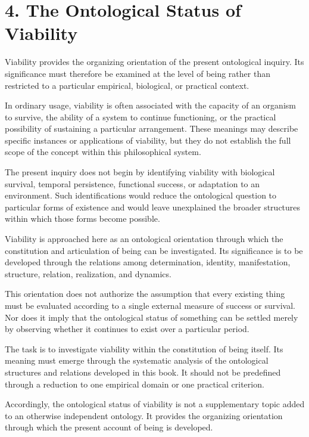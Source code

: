 
\section*{4. The Ontological Status of Viability}

Viability provides the organizing orientation of the
present ontological inquiry. Its significance must therefore
be examined at the level of being rather than restricted
to a particular empirical, biological, or practical context.

In ordinary usage, viability is often associated with the
capacity of an organism to survive, the ability of a system
to continue functioning, or the practical possibility
of sustaining a particular arrangement. These meanings
may describe specific instances or applications of
viability, but they do not establish the full scope of
the concept within this philosophical system.

The present inquiry does not begin by identifying
viability with biological survival, temporal persistence,
functional success, or adaptation to an environment.
Such identifications would reduce the ontological question
to particular forms of existence and would leave unexplained
the broader structures within which those forms become
possible.

Viability is approached here as an ontological orientation
through which the constitution and articulation of being
can be investigated. Its significance is to be developed
through the relations among determination, identity,
manifestation, structure, relation, realization, and
dynamics.

This orientation does not authorize the assumption that
every existing thing must be evaluated according to a
single external measure of success or survival. Nor does
it imply that the ontological status of something can
be settled merely by observing whether it continues to
exist over a particular period.

The task is to investigate viability within the constitution
of being itself. Its meaning must emerge through the
systematic analysis of the ontological structures and
relations developed in this book. It should not be
predefined through a reduction to one empirical domain
or one practical criterion.

Accordingly, the ontological status of viability is not
a supplementary topic added to an otherwise independent
ontology. It provides the organizing orientation through
which the present account of being is developed.

